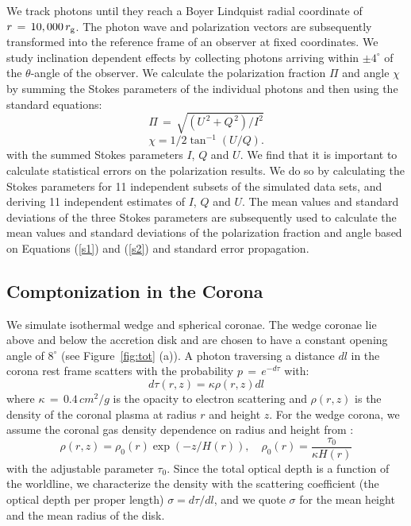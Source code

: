 \documentclass[manuscript]{aastex}
\begin{document}
We track photons until they reach a Boyer Lindquist radial coordinate of $r\,=\,10,000\,r_{\rm g}$.
The photon wave and polarization vectors are subsequently transformed into the reference frame of an observer at fixed coordinates. We study inclination dependent effects by collecting photons arriving within 
$\pm 4^{\circ}$ of the $\theta$-angle of the observer.
We calculate the polarization fraction $\Pi$ and angle $\chi$ by summing the 
Stokes parameters of the individual photons and then using the standard equations:
\begin{equation}
\Pi\,=\,\sqrt{(U^{\,2}+Q^{\,2})/I^2}
\label{s1}
\end{equation}
\begin{equation}
\chi=1/2\tan^{-1}(U/Q).
\label{s2}
\end{equation}
with the summed Stokes parameters $I$, $Q$ and $U$.
We find that it is important to calculate statistical errors on the polarization results.
We do so by calculating the Stokes parameters for 11 independent subsets of the simulated data sets, 
and deriving 11 independent estimates of $I$, $Q$ and $U$.
The mean values and standard deviations of the three Stokes parameters are subsequently used
to calculate the mean values and standard deviations of the polarization fraction and angle
based on Equations (\ref{s1}) and (\ref{s2}) and standard error propagation.
%
\subsection{Comptonization in the Corona}
We simulate isothermal wedge and spherical coronae. 
The wedge coronae lie above and below the accretion disk and are chosen to have a constant opening angle of $8^{\circ}$ 
(see Figure~\ref{fig:tot} (a)). A photon traversing a distance $dl$ in the corona rest frame scatters with the probability 
$p \,=\,e^{-d\tau}$ with: 
\begin{equation}
d\tau(r,z)=\kappa \rho(r,z) dl
\end{equation}
where $\kappa\,=\,0.4\, cm^2/g$ is the opacity to electron scattering and $\rho(r,z)$ 
is the density of the coronal plasma at radius $r$ and height $z$.
For the wedge corona, we assume the coronal gas density dependence on radius and height from \citet[][Equation (6)]{sch10}:
\begin{equation}
\rho(r,z)=\rho_0(r) \exp(-z/H(r)), \quad
\rho_0(r)=\frac{\tau_0}{\kappa H(r)}
\end{equation}
with the adjustable parameter $\tau_0$. Since the total optical depth is a function of the worldline, 
we characterize the density with the scattering coefficient (the optical depth per proper length)  
$\sigma=d\tau/dl$, and we quote $\sigma$  for the mean height and the mean radius of the disk.
\end{document}
